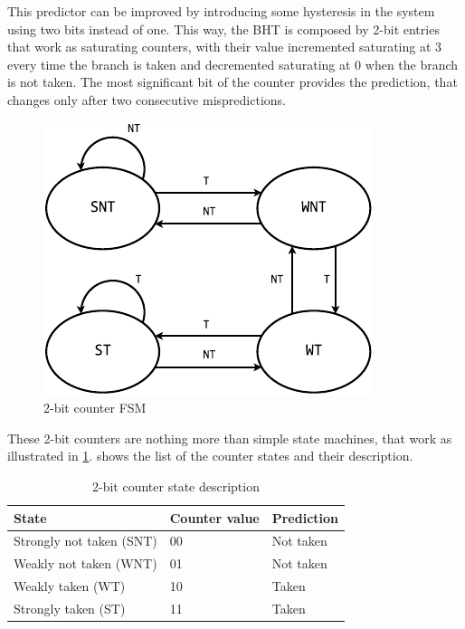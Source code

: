 This predictor can be improved by introducing some hysteresis in the system using two bits instead of one. This way, the \ac{BHT} is composed by 2-bit entries that work as saturating counters, with their value incremented saturating at 3 every time the branch is taken and decremented saturating at 0 when the branch is not taken. The most significant bit of the counter provides the prediction, that changes only after two consecutive mispredictions.
\begin{figure}[hbt]
  \centering
  \includegraphics[scale=1.5]{img/c2b.pdf}
  \caption{2-bit counter FSM}
  \label{fig:c2b}
\end{figure}
These 2-bit counters are nothing more than simple state machines, that work as illustrated in \cref{fig:c2b}.  shows the list of the counter states and their description.

\begin{table}[hbt]
  \centering
  \begin{tabular}{lll}
    \toprule
    \textbf{State}            & \textbf{Counter value}  & \textbf{Prediction} \\ \midrule
    Strongly not taken (SNT)  & 00                      & Not taken \\
    Weakly not taken (WNT)    & 01                      & Not taken \\
    Weakly taken (WT)         & 10                      & Taken     \\
    Strongly taken (ST)       & 11                      & Taken     \\
    \bottomrule
  \end{tabular}
  \caption{2-bit counter state description}
  \label{tab:c2b}
\end{table}


